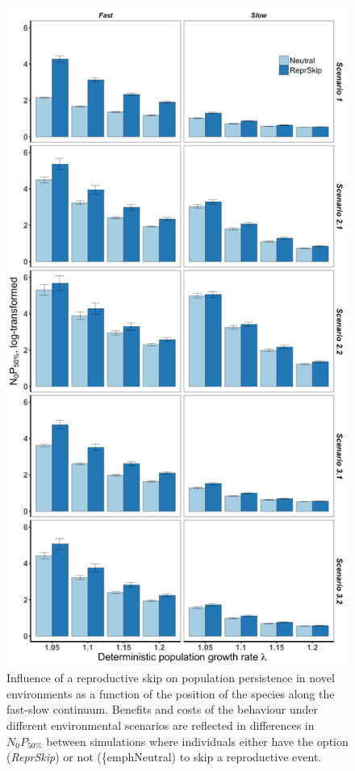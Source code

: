 \begin{figure}
\centering
\includegraphics[height=.75\textheight]{./Figures/Appendix3_2/Fig_10.jpg}
\caption[Effects of \textit{ReprSkip} on $N_{0}P_{50\%}$]{
Influence of a reproductive skip on population persistence in novel environments
as a function of the position of the species along the fast-slow continuum.
Benefits and costs of the behaviour under different environmental scenarios are
reflected in differences in $N_{0}P_{50\%}$ between simulations where
individuals either have the option (\emph{ReprSkip}) or not (\{emph{Neutral}) to
skip a reproductive event.}
\label{fig:figApp3.2.10}
\end{figure}

